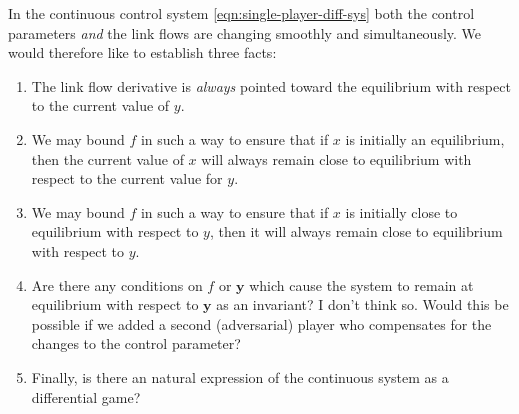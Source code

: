 In the continuous control system \eqref{eqn:single-player-diff-sys} both the control parameters \textit{and} the link flows are changing smoothly and simultaneously. 
We would therefore like to establish three facts:
\begin{enumerate}
    \item The link flow derivative is \textit{always} pointed toward the equilibrium with respect to the current value of $y$.
    \item We may bound $f$ in such a way to ensure that if $x$ is initially an equilibrium, then the current value of $x$ will always remain close to equilibrium with respect to the current value for $y$.
    \item We may bound $f$ in such a way to ensure that if $x$ is initially close to equilibrium with respect to $y$, then  it will always remain close to equilibrium with respect to $y$.
    \item Are there any conditions on $f$ or $\mathbf{y}$ which cause the system to remain at equilibrium with respect to $\mathbf{y}$ as an invariant? I don't think so. Would this be possible if we added a second (adversarial) player who compensates for the changes to the control parameter?
    \item Finally, is there an natural expression of the continuous system as a differential game?
\end{enumerate}
